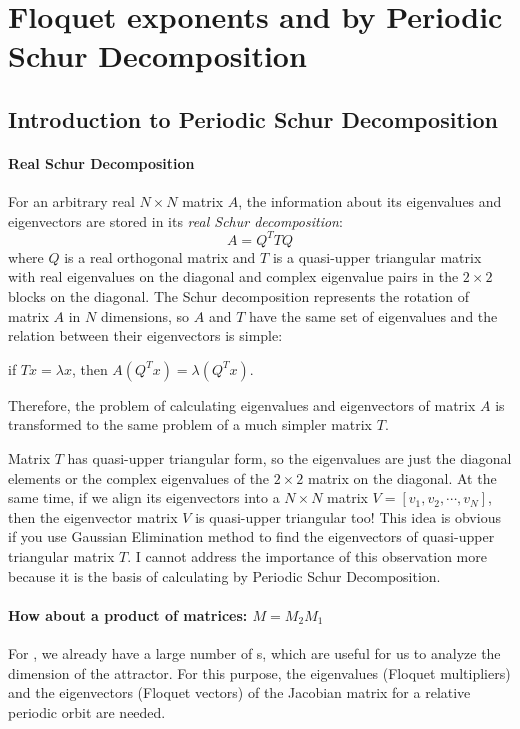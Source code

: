 \section{Floquet exponents and {\cLvs} by Periodic Schur Decomposition }
\subsection{Introduction to Periodic Schur Decomposition}

	\paragraph{Real Schur Decomposition}
		For an arbitrary real $N\times N$ matrix $A$, the information about its eigenvalues and eigenvectors
		are stored in its \textit{real Schur decomposition}:
		\[
			A=Q^{T}TQ
		\]
		where $Q$ is a real orthogonal matrix and $T$ is a quasi-upper triangular matrix with real
		eigenvalues on the diagonal and complex eigenvalue pairs in the $2\times 2$ blocks on the
		diagonal. The Schur decomposition represents the rotation of matrix $A$ in $N$ dimensions,
		so $A$ and $T$ have the same set of eigenvalues and the relation between their eigenvectors
		is simple:
		\begin{center}
		if $Tx=\lambda x$, then $A(Q^{T}x)=\lambda (Q^{T}x)$.
		\end{center}
		Therefore, the problem of
		calculating eigenvalues and eigenvectors of matrix $A$ is transformed to the same problem of
		a much simpler matrix $T$.

		Matrix $T$ has quasi-upper triangular form, so the eigenvalues are just the diagonal elements or
		the complex eigenvalues of the $2\times 2$ matrix on the diagonal. At the same time, if we align
		its eigenvectors into a $N\times N$ matrix $V=[v_{1}, v_{2},\cdots,v_{N}]$, then the eigenvector
		matrix $V$ is quasi-upper triangular too! This idea is obvious if you use Gaussian Elimination
		method to find the eigenvectors of quasi-upper triangular matrix $T$. I cannot address the
		importance of this observation more because it is the basis of calculating {\cLvs}
		by Periodic Schur Decomposition.

	\paragraph{How about a product of matrices: $M=M_{2}M_{1}$ }

		For \KSe, we already have a large number of \rpo s, which are
useful for us 		to analyze the dimension of the attractor. For this
purpose, the eigenvalues (Floquet multipliers) 		and the eigenvectors
(Floquet vectors) of the Jacobian matrix for a relative periodic orbit 		
are needed.

